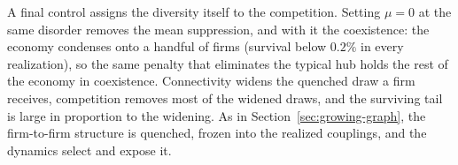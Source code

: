 A final control assigns the diversity itself to the competition. Setting $\mu = 0$ at
the same disorder removes the mean suppression, and with it the coexistence: the
economy condenses onto a handful of firms (survival below $0.2\%$ in every
realization), so the same penalty that eliminates the typical hub holds the rest of the
economy in coexistence. Connectivity widens the quenched draw a firm receives,
competition removes most of the widened draws, and the surviving tail is large in
proportion to the widening. As in Section~\ref{sec:growing-graph}, the firm-to-firm
structure is quenched, frozen into the realized couplings, and the dynamics select and
expose it.
